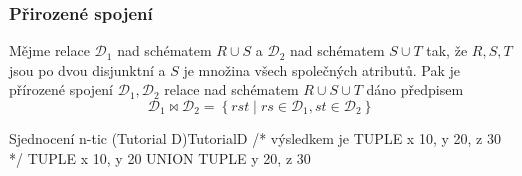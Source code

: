 \subsubsection{Přirozené spojení}
\begin{uptheorem}
Mějme relace $\mathcal{D}_{1}$ nad schématem $R \cup S$ a $\mathcal{D}_{2}$ nad schématem $S \cup T$ tak, že $R, S, T$ jsou po dvou disjunktní a $S$ je množina všech společných atributů. Pak je přírozené spojení $\mathcal{D}_{1}, \mathcal{D}_{2}$ relace nad schématem $R \cup S \cup T$ dáno předpisem
$$
\mathcal{D}_{1} \Join \mathcal{D}_{2} = \left\{ rst \; | \; rs \in \mathcal{D}_{1}, st \in \mathcal{D}_{2} \right\}
$$
\end{uptheorem}
\begin{upcode}{Sjednocení n-tic (Tutorial D)}{}{TutorialD}
/* výsledkem je TUPLE {x 10, y 20, z 30} */
TUPLE {x 10, y 20} UNION TUPLE {y 20, z 30}
\end{upcode}
